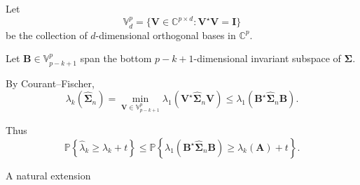 \documentclass[pdf,mpa]{prosper}
\newcommand{\mat}[1]{\ensuremath{\mathbf{#1}}}
\newcommand{\Prob}[1]{\ensuremath{\mathbb{P}\left\{#1 \right\}}}
\newcommand{\C}{\ensuremath{\mathbb{C}}}
\begin{document}
\begin{slide}{}

Let
\[
\mathbb{V}^p_d = \{ \mat{V} \in \C^{p \times d} : \mat{V}^\star \mat{V} = \mat{I} \}
\]
be the collection of $d$-dimensional orthogonal bases in $\C^p$. 

Let $\mat{B} \in \mathbb{V}^p_{p-k+1}$ span the bottom $p-k+1$-dimensional invariant subspace of $\mat{\Sigma}.$

By Courant--Fischer,
\[
\lambda_k(\widehat{\mat{\Sigma}}_n) = \min_{\mat{V} \in \mathbb{V}^p_{p-k+1}} \lambda_1(\mat{V}^\star \widehat{\mat{\Sigma}}_n\mat{V}) \leq \lambda_1(\mat{B}^\star \widehat{\mat{\Sigma}}_n \mat{B}).
\]

Thus 
\[
\Prob{\hat{\lambda}_k \geq \lambda_k + t } \leq \Prob{\lambda_1(\mat{B}^\star \widehat{\mat{\Sigma}}_n \mat{B}) \geq \lambda_k(\mat{A}) + t }.
\]

\end{slide}


\begin{slide}{A natural extension}
\end{slide}
\end{document}
